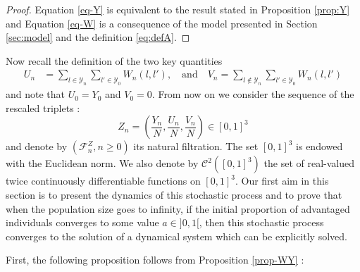 \documentclass[11pt]{article}
\theoremstyle{remark}
\numberwithin{equation}{section}
\begin{document}
\begin{proof} Equation \eqref{eq-Y} is equivalent to the result stated in Proposition \ref{prop:Y} and Equation \eqref{eq-W} is a consequence of the model presented in Section \ref{sec:model} and the definition \eqref{eq:defA}.
\end{proof}

Now recall the definition of the two key quantities 
\begin{align*}
U_n&=\sum_{l\in\mathcal{Y}_n}\sum_{l'\in\mathcal{Y}_0} W_n(l,l'), \quad\text{and}\quad
V_n=\sum_{l\notin\mathcal{Y}_n}\sum_{l'\in\mathcal{Y}_0} W_n(l,l')
\end{align*} and note that $U_0=Y_0$ and $V_0=0$. From now on we consider the sequence of the rescaled triplets :
$$Z_n=\left(\frac{Y_n}{N},\frac{U_n}{N},\frac{V_n}{N}\right)\in[0,1]^3$$ and denote by $(\mathcal{F}^Z_n,n\geq0)$ its natural filtration. The set $[0,1]^3$ is endowed with the Euclidean norm. We also denote by $\mathcal{C}^2([0,1]^3)$ the set of real-valued twice continuously differentiable functions on $[0,1]^3$. Our first aim in this section is to present the dynamics of this stochastic process and to prove that when the population size goes to infinity, if the initial proportion of advantaged individuals converges to some value $a\in]0,1[$, then this stochastic process converges to the solution of a dynamical system which can be explicitly solved.

\medskip
First, the following proposition follows from Proposition \ref{prop-WY} : 
\end{document}
